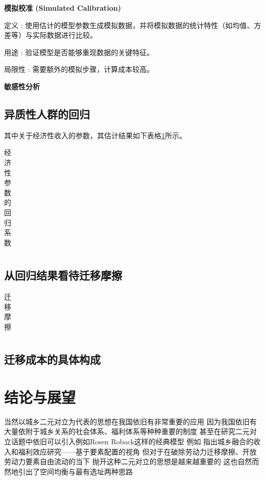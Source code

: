 \documentclass[
  a4paper,
  zihao=-4,
  fontset=mac,
  AutoFakeBold,
  AutoFakeSlant,
  oneside]{ctexbook}
\begin{document}
\textbf{模拟校准 (Simulated Calibration)}

定义 : 使用估计的模型参数生成模拟数据，并将模拟数据的统计特性（如均值、方差等）与实际数据进行比较。

用途 : 验证模型是否能够重现数据的关键特征。

局限性 : 需要额外的模拟步骤，计算成本较高。

\textbf{敏感性分析}


\section{异质性人群的回归} 

其中关于经济性收入的参数，其估计结果如下表格\ref{tab:经济性参数的回归系数}所示。
\begin{table}[!ht]
\centering
\caption{经济性参数的回归系数}
\begin{tabularx}{\textwidth}{@{}cXXX@{}}
\toprule
\midrule
\bottomrule
\end{tabularx}
\label{tab:经济性参数的回归系数}
\end{table}


\section{从回归结果看待迁移摩擦}


\begin{table}[!ht]
\centering
\caption{迁移摩擦}
\begin{tabularx}{\textwidth}{@{}cXXX@{}}
\toprule
\midrule
\bottomrule
\end{tabularx}
\label{tab:迁移摩擦}
\end{table}



\section{迁移成本的具体构成}






\chapter{结论与展望}

当然以城乡二元对立为代表的思想在我国依旧有非常重要的应用 因为我国依旧有大量依附于城乡关系的社会体系、福利体系等种种重要的制度
甚至在研究二元对立话题中依旧可以引入例如Rosen Roback这样的经典模型
例如 
\textcite{GuoDongMeiChengXiangRongHeDeShouRuHeFuLiXiaoYingYanJiuJiYuYaoSuPeiZhiDeShiJiao2023}指出城乡融合的收入和福利效应研究——基于要素配置的视角
但对于在破除劳动力迁移摩擦、开放劳动力要素自由流动的当下
抛开这种二元对立的思想是越来越重要的
这也自然而然地引出了空间均衡与最有选址两种思路
\end{document}
